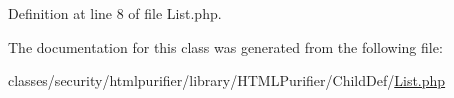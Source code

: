 Definition at line 8 of file List.\+php.



The documentation for this class was generated from the following file\+:\begin{DoxyCompactItemize}
\item 
classes/security/htmlpurifier/library/\+H\+T\+M\+L\+Purifier/\+Child\+Def/\hyperlink{ChildDef_2List_8php}{List.\+php}\end{DoxyCompactItemize}
